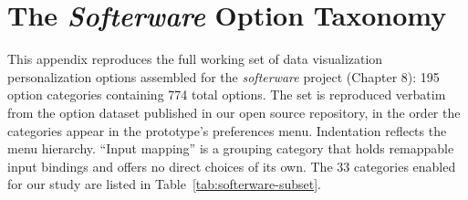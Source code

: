 \documentclass[12pt]{cmuthesis}
\begin{document}
\appendix

\chapter{The \textit{Softerware} Option Taxonomy}
\label{app:softerware-taxonomy}

This appendix reproduces the full working set of data visualization personalization options assembled for the \textit{softerware} project (Chapter 8): 195 option categories containing 774 total options. The set is reproduced verbatim from the option dataset published in our open source repository, in the order the categories appear in the prototype's preferences menu. Indentation reflects the menu hierarchy. ``Input mapping'' is a grouping category that holds remappable input bindings and offers no direct choices of its own. The 33 categories enabled for our study are listed in Table~\ref{tab:softerware-subset}.
\end{document}
